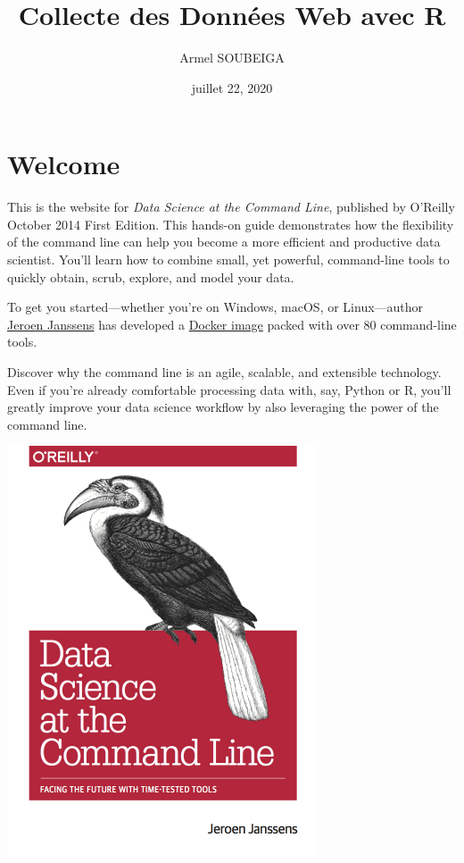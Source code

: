 \documentclass[
]{book}
\title{Collecte des Données Web avec R}
\author{Armel SOUBEIGA}
\date{juillet 22, 2020}
\theoremstyle{definition}
\theoremstyle{definition}
\theoremstyle{definition}
\theoremstyle{remark}
\begin{document}
\maketitle

{
\setcounter{tocdepth}{1}
\tableofcontents
}
\hypertarget{welcome}{%
\chapter*{Welcome}\label{welcome}}

This is the website for \emph{Data Science at the Command Line}, published by O'Reilly October 2014 First Edition. This hands-on guide demonstrates how the flexibility of the command line can help you become a more efficient and productive data scientist. You'll learn how to combine small, yet powerful, command-line tools to quickly obtain, scrub, explore, and model your data.

To get you started---whether you're on Windows, macOS, or Linux---author \href{https://twitter.com/jeroenhjanssens}{Jeroen Janssens} has developed a \href{https://hub.docker.com/r/datascienceworkshops/data-science-at-the-command-line}{Docker image} packed with over 80 command-line tools.

Discover why the command line is an agile, scalable, and extensible technology. Even if you're already comfortable processing data with, say, Python or R, you'll greatly improve your data science workflow by also leveraging the power of the command line.

\includegraphics[width=349px,class="cover"]{images/cover}
\end{document}
